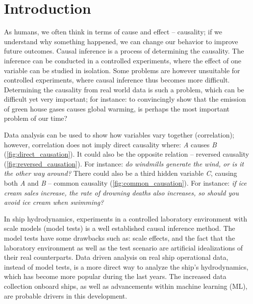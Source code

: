 \section{Introduction}

As humans, we often think in terms of cause and effect -- causality; if we understand why something happened, we can change our behavior to improve future outcomes. 
Causal inference is a process of determining the causality. The inference can be conducted in a controlled experiments, where the effect of one variable can be studied in isolation.
Some problems are however unsuitable for controlled experiments, where causal inference thus becomes more difficult. Determining the causality from real world data is such a problem, which can be difficult yet very important; for instance: to convincingly show that the emission of green house gases causes global warming, is perhaps the most important problem of our time? 

Data analysis can be used to show how variables vary together (correlation); however, correlation does not imply direct causality where: \emph{A} causes \emph{B} (\autoref{fig:direct_causation}). It could also be the opposite relation -- reversed causality (\autoref{fig:reversed_causation}). 
For instance: \emph{do windmills generate the wind, or is it the other way around?} There could also be a third hidden variable \emph{C}, causing both \emph{A} and \emph{B} -- common causality (\autoref{fig:common_causation}). For instance: \emph{if ice cream sales increase, the rate of drowning deaths also increases, so should you avoid ice cream when swimming?}


In ship hydrodynamics, experiments in a controlled laboratory environment with scale models (model tests) is a well established causal inference method.  
The model tests have some drawbacks such as: scale effects, and the fact that the laboratory environment as well as the test scenario are artificial idealizations of their real counterparts.
Data driven analysis on real ship operational data, instead of model tests, is a more direct way to analyze the ship's hydrodynamics, which has become more popular during the last years. The increased data collection onboard ships, as well as advancements within machine learning (ML), are probable drivers in this development. 

